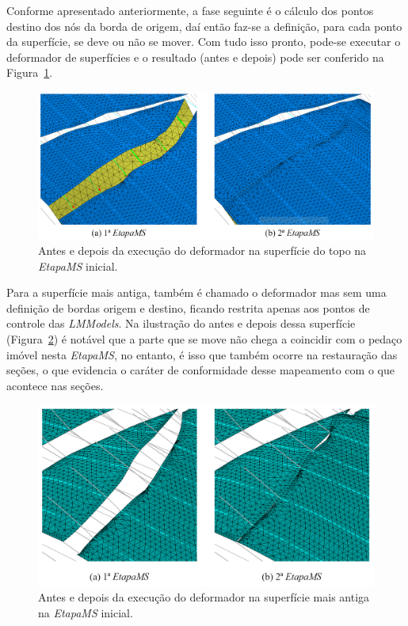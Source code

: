 Conforme apresentado anteriormente, a fase seguinte é o cálculo dos pontos destino dos nós da borda de origem, daí então faz-se a definição, para cada ponto da superfície, se deve ou não se mover. Com tudo isso pronto, pode-se executar o deformador de superfícies e o resultado (antes e depois) pode ser conferido na Figura~\ref{fig-example-2-7}.

\begin{figure} [H]
  \begin{center}
    \includegraphics[width=\textwidth]{images/fig-example-2-7}
    \caption{Antes e depois da execução do deformador na superfície do topo na \textit{EtapaMS} inicial.}\label{fig-example-2-7}
  \end{center}
\end{figure}

Para a superfície mais antiga, também é chamado o deformador mas sem uma definição de bordas origem e destino, ficando restrita apenas aos pontos de controle das \textit{LMModels}. Na ilustração do antes e depois dessa superfície (Figura~\ref{fig-example-2-8}) é notável que a parte que se move não chega a coincidir com o pedaço imóvel nesta \textit{EtapaMS}, no entanto, é isso que também ocorre na restauração das seções, o que evidencia o caráter de conformidade desse mapeamento com o que acontece nas seções.

\begin{figure} [H]
  \begin{center}
    \includegraphics[width=340pt]{images/fig-example-2-8}
    \caption{Antes e depois da execução do deformador na superfície mais antiga na \textit{EtapaMS} inicial.}\label{fig-example-2-8}
  \end{center}
\end{figure}


